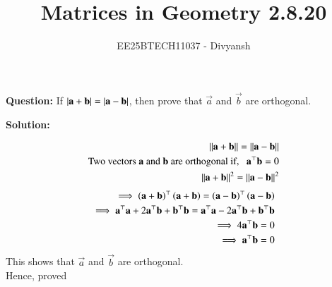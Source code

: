 \documentclass[journal,12pt,onecolumn]{IEEEtran}
\title{Matrices in Geometry 2.8.20}
\author{EE25BTECH11037 - Divyansh}
\theoremstyle{remark}
\begin{document}
\vspace{3cm}
\maketitle
{\let\newpage\relax\maketitle}
\textbf{Question: }
If $\left\vert\mathbf{a}+\mathbf{b}\right\vert=\left\vert\mathbf{a}-\mathbf{b}\right\vert$, then prove that $\vec{a}$ and $\vec{b}$ are orthogonal.
\vspace{2mm}

\textbf{Solution:}
 
\begin{align}
    \norm{\vec{a}+\vec{b}}=\norm{\vec{a}-\vec{b}}\\
    \text{Two vectors $\vec{a}$ and $\vec{b}$ are orthogonal if,} \ \ \ \vec{a}^{\top}\vec{b}=0\\
    \norm{\vec{a}+\vec{b}}^2=\norm{\vec{a}-\vec{b}}^2 
\end{align}
\begin{align}
    \implies \left(\mathbf{a}+\mathbf{b}\right)^{\top}\left(\mathbf{a}+\mathbf{b}\right)= \left(\mathbf{a}-\mathbf{b}\right)^{\top}\left(\mathbf{a}-\mathbf{b}\right)\\
    \implies \mathbf{a}^{\top}\mathbf{a} + 2\mathbf{a}^{\top}\mathbf{b}+ \mathbf{b}^{\top}\mathbf{b}=\mathbf{a}^{\top}\mathbf{a} - 2\mathbf{a}^{\top}\mathbf{b}+ \mathbf{b}^{\top}\mathbf{b}\\
    \implies 4\mathbf{a}^{\top}\mathbf{b}=0\\
    \implies \mathbf{a}^{\top}\mathbf{b}=0
\end{align}
This shows that $\vec{a}$ and $\vec{b}$ are orthogonal.\\
Hence, proved
\end{document}
